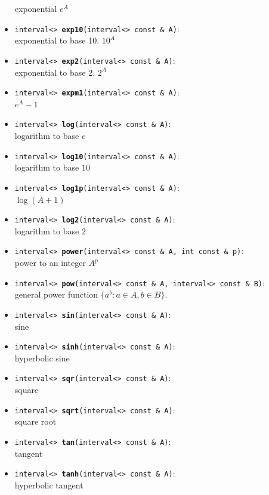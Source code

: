 \documentclass{report}
\begin{document}
\begin{itemize}
			exponential $e^A$
		\item
			\texttt{interval<> {\bf exp10}(interval<> const \& A)}:\\
			exponential to base 10. $10^A$
		\item
			\texttt{interval<> {\bf exp2}(interval<> const \& A)}:\\
			exponential to base 2. $2^A$
		\item
			\texttt{interval<> {\bf expm1}(interval<> const \& A)}:\\
			$e^A - 1$
		\item
			\texttt{interval<> {\bf log}(interval<> const \& A)}:\\
			logarithm to base $e$
		\item
			\texttt{interval<> {\bf log10}(interval<> const \& A)}:\\
						logarithm to base $10$
		\item
			\texttt{interval<> {\bf log1p}(interval<> const \& A)}:\\
			 $\log(A+1)$ 
		\item
			\texttt{interval<> {\bf log2}(interval<> const \& A)}:\\
						logarithm to base $2$
		\item
			\texttt{interval<> {\bf power}(interval<> const \& A, int const \& p)}:\\
			power to an integer $A^p$
		\item
			\texttt{interval<> {\bf pow}(interval<> const \& A, interval<> const \& B)}:\\
			general power function
			$\{ a^b : a\in A, b\in B \}$.
		\item
			\texttt{interval<> {\bf sin}(interval<> const \& A)}:\\
			sine
		\item
			\texttt{interval<> {\bf sinh}(interval<> const \& A)}:\\
			hyperbolic sine
		\item
			\texttt{interval<> {\bf sqr}(interval<> const \& A)}:\\
			square 
		\item
			\texttt{interval<> {\bf sqrt}(interval<> const \& A)}:\\
			square root
		\item
			\texttt{interval<> {\bf tan}(interval<> const \& A)}:\\
			tangent
		\item
			\texttt{interval<> {\bf tanh}(interval<> const \& A)}:\\
		hyperbolic tangent
\end{itemize}
\end{document}
